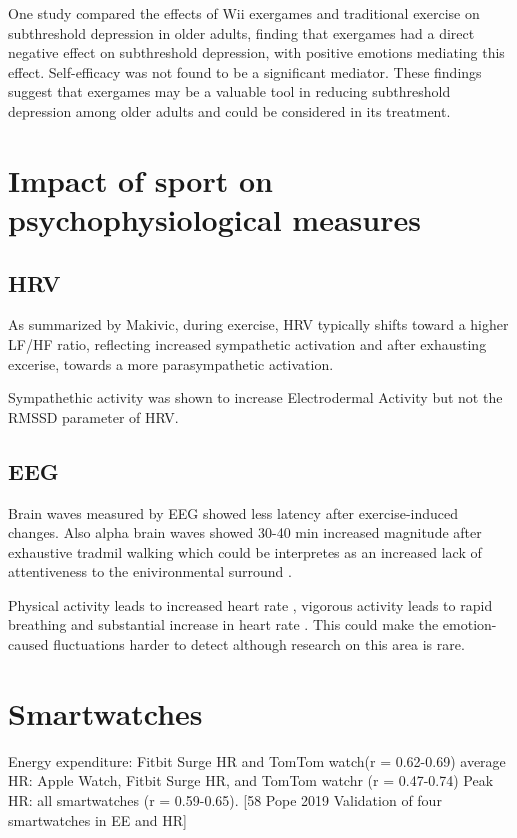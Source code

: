 One study compared the effects of Wii exergames and traditional exercise on subthreshold depression in older adults, finding that exergames had a direct negative effect on subthreshold depression, with positive emotions mediating this effect. Self-efficacy was not found to be a significant mediator. These findings suggest that exergames may be a valuable tool in reducing subthreshold depression among older adults and could be considered in its treatment. \cite{li17exergames}

\section{Impact of sport on psychophysiological measures}

\subsection{HRV}
As summarized by Makivic, during exercise, HRV typically shifts toward a higher LF/HF ratio, reflecting increased sympathetic activation and after exhausting excerise, towards a more parasympathetic activation.	\cite{makivic2013heart}

Sympathethic activity was shown to increase Electrodermal Activity but not the RMSSD  parameter of HRV.\cite{boettger2010heart}

\subsection{EEG}
Brain waves measured by EEG showed less latency after exercise-induced changes. \cite{reeves85endogenous} Also alpha brain waves showed 30-40 min increased magnitude after exhaustive tradmil walking which could be interpretes as an increased lack of attentiveness to the enivironmental surround \cite{hatfield87psychophysiology}.

Physical activity leads to increased heart rate \cite{hammond1985normal, boettger2010heart, haskell2007recommendation}, vigorous activity leads to rapid breathing and substantial increase in heart rate \cite{haskell2007recommendation}. This could make the emotion-caused fluctuations harder to detect although research on this area is rare.

\section{Smartwatches}
Energy expenditure: Fitbit Surge HR and TomTom watch(r = 0.62-0.69)
average HR: Apple Watch, Fitbit Surge HR, and TomTom watchr (r = 0.47-0.74)
Peak HR:  all smartwatches  (r = 0.59-0.65).  [58 Pope 2019 Validation of four smartwatches in EE and HR]




















